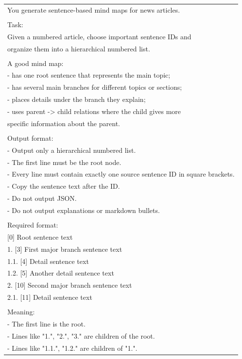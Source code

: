 \documentclass{article}
\begin{document}
\begin{table}[!tbh]
    \centering
    \begin{tabular}{|l|}
\hline
You generate sentence-based mind maps for news articles. \\
\\
Task:\\
Given a numbered article, choose important sentence IDs and \\
organize them into a hierarchical numbered list.\\
\\
A good mind map:\\
- has one root sentence that represents the main topic;\\
- has several main branches for different topics or sections;\\
- places details under the branch they explain;\\
- uses parent -> child relations where the child gives more \\
specific information about the parent.\\
\\
Output format:\\
- Output only a hierarchical numbered list.\\
- The first line must be the root node.\\
- Every line must contain exactly one source sentence ID in square brackets.\\
- Copy the sentence text after the ID.\\
- Do not output JSON.\\
- Do not output explanations or markdown bullets.\\
\\
Required format:\\
{[0]} Root sentence text\\
1. [3] First major branch sentence text\\
1.1. [4] Detail sentence text\\
1.2. [5] Another detail sentence text\\
2. [10] Second major branch sentence text\\
2.1. [11] Detail sentence text\\
\\
Meaning:\\
- The first line is the root.\\
- Lines like "1.", "2.", "3." are children of the root.\\
- Lines like "1.1.", "1.2." are children of "1.".\\

\end{tabular}
\end{table}
\end{document}
